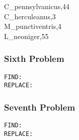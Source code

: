 \documentclass[
]{article}
\begin{document}
C\_pennsylvanicus,44\\
C\_herculeanus,3\\
M\_punctiventris,4\\
L\_neoniger,55

\hypertarget{sixth-problem}{%
\subsubsection{Sixth Problem}\label{sixth-problem}}

\begin{verbatim}
FIND: 
REPLACE:
\end{verbatim}

\hypertarget{seventh-problem}{%
\subsubsection{Seventh Problem}\label{seventh-problem}}

\begin{verbatim}
FIND: 
REPLACE: 
\end{verbatim}
\end{document}
